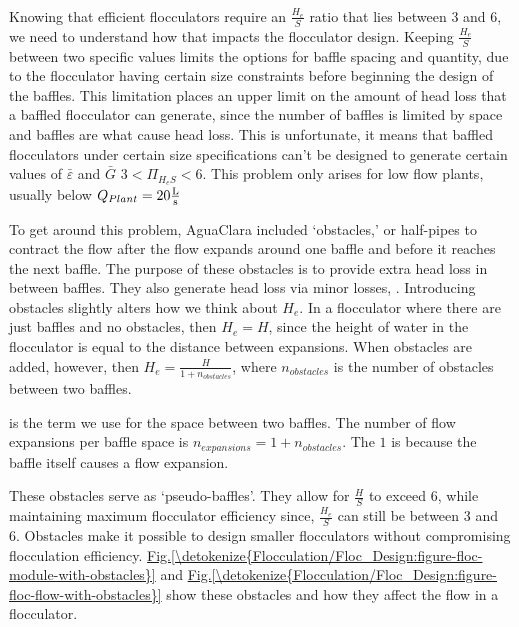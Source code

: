 \documentclass[letterpaper,10pt,english]{sphinxmanual}
\begin{document}
\subsubsection{}
\label{\detokenize{Flocculation/Floc_Design:obstacles}}
Knowing that efficient flocculators require an \(\frac{H_e}{S}\) ratio that lies between 3 and 6, we need to understand how that impacts the flocculator design. Keeping \(\frac{H_e}{S}\) between two specific values limits the options for baffle spacing and quantity, due to the flocculator having certain size constraints before beginning the design of the baffles. This limitation places an upper limit on the amount of head loss that a baffled flocculator can generate, since the number of baffles is limited by space and baffles are what cause head loss. This is unfortunate, it means that baffled flocculators under certain size specifications can’t be designed to generate certain values of \(\bar \varepsilon\) and \(\bar G\)  \(3 < \Pi_{H_eS} < 6\). This problem only arises for low flow plants, usually below \(Q_{Plant} = 20 {\rm \frac{L}{s}}\)

To get around this problem, AguaClara included ‘obstacles,’ or half-pipes to contract the flow after the flow expands around one baffle and before it reaches the next baffle. The purpose of these obstacles is to provide extra head loss in between baffles. They also generate head loss via minor losses, . Introducing obstacles slightly alters how we think about \(H_e\). In a flocculator where there are just baffles and no obstacles, then \(H_e = H\), since the height of water in the flocculator is equal to the distance between expansions. When obstacles are added, however, then \(H_e = \frac{H}{1 + n_{obstacles}}\), where \(n_{obstacles}\) is the number of obstacles between two baffles.

 is the term we use for the space between two baffles. The number of flow expansions per baffle space is \(n_{expansions} = 1 + n_{obstacles}\). The \(1\) is because the baffle itself causes a flow expansion.

These obstacles serve as ‘pseudo-baffles’. They allow for \(\frac{H}{S}\) to exceed 6, while maintaining maximum flocculator efficiency since, \(\frac{H_e}{S}\) can still be between 3 and 6. Obstacles make it possible to design smaller flocculators without compromising flocculation efficiency. \hyperref[\detokenize{Flocculation/Floc_Design:figure-floc-module-with-obstacles}]{Fig.\@ \ref{\detokenize{Flocculation/Floc_Design:figure-floc-module-with-obstacles}}} and \hyperref[\detokenize{Flocculation/Floc_Design:figure-floc-flow-with-obstacles}]{Fig.\@ \ref{\detokenize{Flocculation/Floc_Design:figure-floc-flow-with-obstacles}}} show these obstacles and how they affect the flow in a flocculator.
\end{document}
